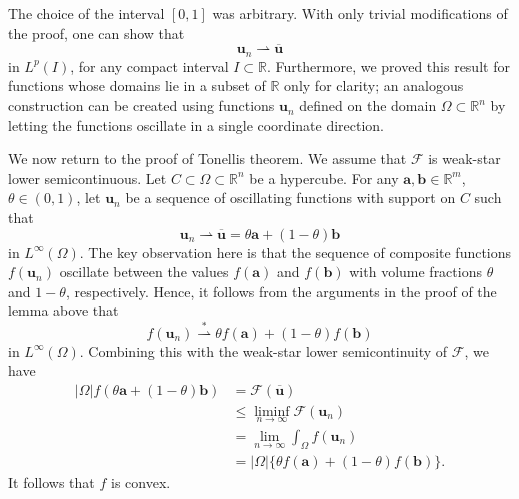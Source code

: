 \begin{Remark}
\label{rem:oscillating-sequence-interval-and-dimension}
The choice of the interval $[0,1]$ was arbitrary. With only trivial modifications of the proof, one can show that
\begin{equation}\label{eq:oscillating-sequence-general-compact-interval-limit}
\bm{u}_n\rightharpoonup\overline{\bm{u}}
\end{equation}
in $L^p(I)$, for any compact interval $I\subset\mathbb{R}$. Furthermore, we proved this result for functions whose domains lie in a subset of $\mathbb{R}$ only for clarity; an analogous construction can be created using functions $\bm{u}_n$ defined on the domain $\Omega\subset\mathbb{R}^n$ by letting the functions oscillate in a single coordinate direction.
\end{Remark}

We now return to the proof of Tonelli\textquotesingle s theorem. We assume that $\mathcal{F}$ is weak-star lower semicontinuous. Let $C\subset\Omega\subset\mathbb{R}^n$ be a hypercube. For any $\bm{a},\bm{b}\in\mathbb{R}^m$, $\theta\in(0,1)$, let $\bm{u}_n$ be a sequence of oscillating functions with support on $C$ such that
\begin{equation}\label{eq:tonelli-necessity-two-state-weak-limit}
\bm{u}_n\rightharpoonup\overline{\bm{u}}=\theta\bm{a}+(1-\theta)\bm{b}
\end{equation}
in $L^\infty(\Omega)$. The key observation here is that the sequence of composite functions $f(\bm{u}_n)$ oscillate between the values $f(\bm{a})$ and $f(\bm{b})$ with volume fractions $\theta$ and $1-\theta$, respectively. Hence, it follows from the arguments in the proof of the lemma above that
\begin{equation}\label{eq:tonelli-necessity-composite-weak-star-limit}
f(\bm{u}_n)\overset{*}{\rightharpoonup}\theta f(\bm{a})+(1-\theta)f(\bm{b})
\end{equation}
in $L^\infty(\Omega)$. Combining this with the weak-star lower semicontinuity of $\mathcal{F}$, we have\[
\begin{aligned}
 |\Omega|f(\theta\bm{a}+(1-\theta)\bm{b})&=\mathcal{F}(\overline{\bm{u}})\\
 &\leq\liminf_{n\to\infty}\mathcal{F}(\bm{u}_n)\\
 &=\lim_{n\to\infty}\int_\Omega f(\bm{u}_n)\\
 &=|\Omega|\{\theta f(\bm{a})+(1-\theta)f(\bm{b})\}.
\end{aligned}
\]It follows that $f$ is convex.

